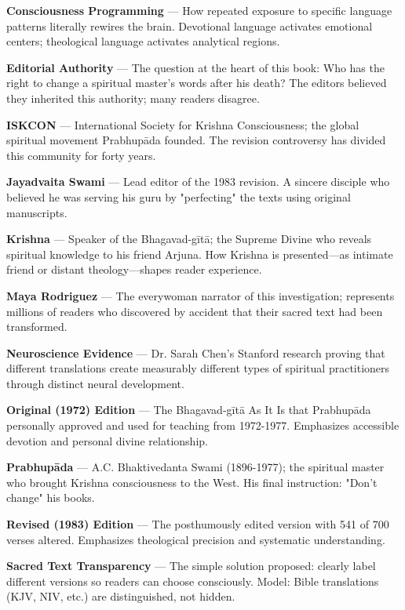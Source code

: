 \documentclass[11pt,twoside]{book}
\begin{document}
\textbf{\textbf{Consciousness Programming}} — How repeated exposure to specific language patterns literally rewires the brain. Devotional language activates emotional centers; theological language activates analytical regions.

\textbf{\textbf{Editorial Authority}} — The question at the heart of this book: Who has the right to change a spiritual master's words after his death? The editors believed they inherited this authority; many readers disagree.

\textbf{\textbf{ISKCON}} — International Society for Krishna Consciousness; the global spiritual movement Prabhupāda founded. The revision controversy has divided this community for forty years.

\textbf{\textbf{Jayadvaita Swami}} — Lead editor of the 1983 revision. A sincere disciple who believed he was serving his guru by "perfecting" the texts using original manuscripts.

\textbf{\textbf{Krishna}} — Speaker of the Bhagavad-gītā; the Supreme Divine who reveals spiritual knowledge to his friend Arjuna. How Krishna is presented—as intimate friend or distant theology—shapes reader experience.

\textbf{\textbf{Maya Rodriguez}} — The everywoman narrator of this investigation; represents millions of readers who discovered by accident that their sacred text had been transformed.

\textbf{\textbf{Neuroscience Evidence}} — Dr. Sarah Chen's Stanford research proving that different translations create measurably different types of spiritual practitioners through distinct neural development.

\textbf{\textbf{Original (1972) Edition}} — The Bhagavad-gītā As It Is that Prabhupāda personally approved and used for teaching from 1972-1977. Emphasizes accessible devotion and personal divine relationship.

\textbf{\textbf{Prabhupāda}} — A.C. Bhaktivedanta Swami (1896-1977); the spiritual master who brought Krishna consciousness to the West. His final instruction: "Don't change" his books.

\textbf{\textbf{Revised (1983) Edition}} — The posthumously edited version with 541 of 700 verses altered. Emphasizes theological precision and systematic understanding.

\textbf{\textbf{Sacred Text Transparency}} — The simple solution proposed: clearly label different versions so readers can choose consciously. Model: Bible translations (KJV, NIV, etc.) are distinguished, not hidden.
\end{document}

